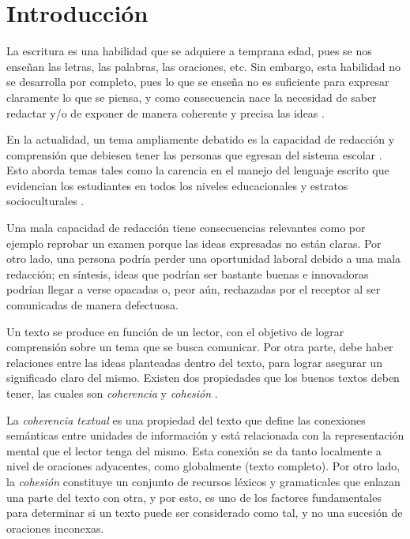 \documentclass[12pt]{diicc}
\begin{document}
%
% 
\mainmatter
\chapter{Introducción}\label{chap:intro}

La escritura es una habilidad que se adquiere a temprana edad, pues se nos enseñan las letras, las palabras, las oraciones, etc. Sin embargo, esta habilidad no se desarrolla por completo, pues lo que se enseña no es suficiente para expresar claramente lo que se piensa, y como consecuencia nace la necesidad de saber redactar y/o de exponer de manera coherente y precisa las ideas \cite{t21}. 

En la actualidad, un tema ampliamente debatido es la capacidad de redacción y comprensión que debiesen tener las personas que egresan del sistema escolar \cite{t22}. Esto aborda temas tales como la carencia en el manejo del lenguaje escrito que evidencian los estudiantes en todos los niveles educacionales y estratos socioculturales \cite{t23}.

Una mala capacidad de redacción tiene consecuencias relevantes como por ejemplo reprobar un examen porque las ideas expresadas no están claras. Por otro lado, una persona podría perder una oportunidad laboral debido a una mala redacción; en síntesis, ideas que podrían ser bastante buenas e innovadoras podrían llegar a verse opacadas o, peor aún, rechazadas por el receptor al ser comunicadas de manera defectuosa.

Un texto se produce en función de un lector, con el objetivo de lograr comprensión sobre un tema que se busca comunicar. Por otra parte, debe haber relaciones entre las ideas planteadas dentro del texto, para lograr asegurar un significado claro del mismo. Existen dos propiedades que los buenos textos deben tener, las cuales son {\em coherencia} y {\em cohesión} \cite{t32}.

La {\em coherencia textual} es una propiedad del texto que define las conexiones semánticas entre unidades de información y está relacionada con la representación mental que el lector tenga del mismo. Esta conexión se da tanto localmente a nivel de oraciones adyacentes, como globalmente (texto completo). Por otro lado, la {\em cohesión} constituye un conjunto de recursos léxicos y gramaticales que enlazan una parte del texto con otra, y por esto, es uno de los factores fundamentales para determinar si un texto puede ser considerado como tal, y no una sucesión de oraciones inconexas.
\end{document}
